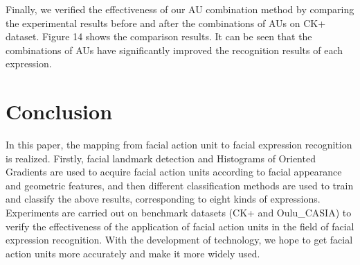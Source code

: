 \documentclass[10pt, conference, compsocconf]{IEEEtran}
\begin{document}
Finally, we verified the effectiveness of our AU combination method by comparing the experimental results before and after the combinations of AUs on CK+ dataset. Figure 14 shows the comparison results. It can be seen that the combinations of AUs have significantly improved the recognition results of each expression.

\section{Conclusion}

In this paper, the mapping from facial action unit to facial expression recognition is realized. Firstly, facial landmark detection and Histograms of Oriented Gradients are used to acquire facial action units according to facial appearance and geometric features, and then different classification methods are used to train and classify the above results, corresponding to eight kinds of expressions. Experiments are carried out on benchmark datasets (CK+ and Oulu\_CASIA) to verify the effectiveness of the application of facial action units in the field of facial expression recognition. With the development of technology, we hope to get facial action units more accurately and make it more widely used.


%
%

\end{document}
